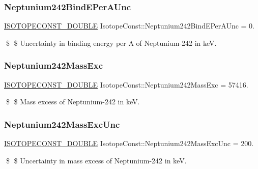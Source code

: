 \subsubsection{\texorpdfstring{Neptunium242\+Bind\+E\+Per\+A\+Unc}{Neptunium242BindEPerAUnc}}
{\footnotesize\ttfamily \mbox{\hyperlink{group___isotope_const-_macros_ga8f45a7272ce02c0b4c65c44636ed719a}{I\+S\+O\+T\+O\+P\+E\+C\+O\+N\+S\+T\+\_\+\+D\+O\+U\+B\+LE}} Isotope\+Const\+::\+Neptunium242\+Bind\+E\+Per\+A\+Unc = 0.}

\$ \$ Uncertainty in binding energy per A of Neptunium-\/242 in keV. \mbox{\label{group___isotope_const-_neptunium-_np242_gae5e35f35b128a6b90bc412b1b10d62a3}} 
\subsubsection{\texorpdfstring{Neptunium242\+Mass\+Exc}{Neptunium242MassExc}}
{\footnotesize\ttfamily \mbox{\hyperlink{group___isotope_const-_macros_ga8f45a7272ce02c0b4c65c44636ed719a}{I\+S\+O\+T\+O\+P\+E\+C\+O\+N\+S\+T\+\_\+\+D\+O\+U\+B\+LE}} Isotope\+Const\+::\+Neptunium242\+Mass\+Exc = 57416.}

\$ \$ Mass excess of Neptunium-\/242 in keV. \mbox{\label{group___isotope_const-_neptunium-_np242_ga52e884562977ba2de9d19facb6bbb214}} 
\subsubsection{\texorpdfstring{Neptunium242\+Mass\+Exc\+Unc}{Neptunium242MassExcUnc}}
{\footnotesize\ttfamily \mbox{\hyperlink{group___isotope_const-_macros_ga8f45a7272ce02c0b4c65c44636ed719a}{I\+S\+O\+T\+O\+P\+E\+C\+O\+N\+S\+T\+\_\+\+D\+O\+U\+B\+LE}} Isotope\+Const\+::\+Neptunium242\+Mass\+Exc\+Unc = 200.}

\$ \$ Uncertainty in mass excess of Neptunium-\/242 in keV. \mbox{\label{group___isotope_const-_neptunium-_np242_ga068e4d8bb155c975e0773ac1cae4f76b}} 
